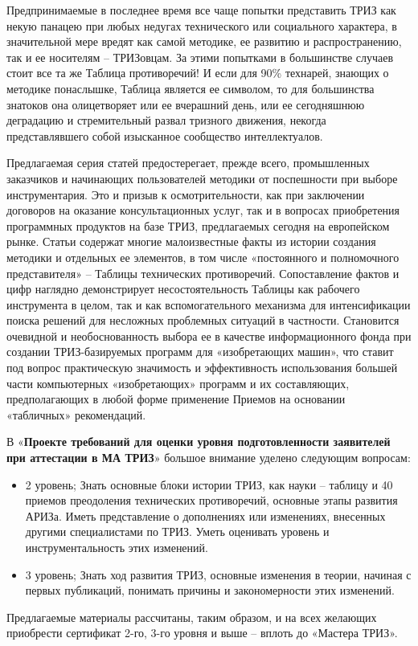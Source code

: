 \documentclass[11pt,a4paper]{article}
\begin{document}
Предпринимаемые в последнее время все чаще попытки представить ТРИЗ как некую
панацею при любых недугах технического или социального характера, в
значительной мере вредят как самой методике, ее развитию и распространению,
так и ее носителям -- ТРИЗовцам. За этими попытками в большинстве случаев
стоит все та же Таблица противоречий! И если для 90\% технарей, знающих о
методике понаслышке, Таблица является ее символом, то для большинства знатоков
она олицетворяет или ее вчерашний день, или ее сегодняшнюю деградацию и
стремительный развал тризного движения, некогда представлявшего собой
изысканное сообщество интеллектуалов.

Предлагаемая серия статей предостерегает, прежде всего, промышленных
заказчиков и начинающих пользователей методики от поспешности при выборе
инструментария. Это и призыв к осмотрительности, как при заключении договоров
на оказание консультационных услуг, так и в вопросах приобретения программных
продуктов на базе ТРИЗ, предлагаемых сегодня на европейском рынке. Статьи
содержат многие малоизвестные факты из истории создания методики и отдельных
ее элементов, в том числе «постоянного и полномочного представителя» --
Таблицы технических противоречий. Сопоставление фактов и цифр наглядно
демонстрирует несостоятельность Таблицы как рабочего инструмента в целом, так
и как вспомогательного механизма для интенсификации поиска решений для
несложных проблемных ситуаций в частности. Становится очевидной и
необоснованность выбора ее в качестве информационного фонда при создании
ТРИЗ-базируемых программ для «изобретающих машин», что ставит под вопрос
практическую значимость и эффективность использования большей части
компьютерных «изобретающих» программ и их составляющих, предполагающих в любой
форме применение Приемов на основании «табличных» рекомендаций.

В «\textbf{Проекте требований для оценки уровня подготовленности заявителей
  при аттестации в МА ТРИЗ}» \cite[Приложение 2]{MATRIZ2003} большое внимание
уделено следующим вопросам:
\begin{itemize}
\item 2 уровень; Знать основные блоки истории ТРИЗ, как науки -- таблицу и 40
  приемов преодоления технических противоречий, основные этапы развития АРИЗа.
  Иметь представление о дополнениях или изменениях, внесенных другими
  специалистами по ТРИЗ. Уметь оценивать уровень и инструментальность этих
  изменений.
\item 3 уровень; Знать ход развития ТРИЗ, основные изменения в теории, начиная
  с первых публикаций, понимать причины и закономерности этих изменений.
\end{itemize}
Предлагаемые материалы рассчитаны, таким образом, и на всех желающих
приобрести сертификат 2-го, 3-го уровня и выше -- вплоть до «Мастера ТРИЗ».
\end{document}
